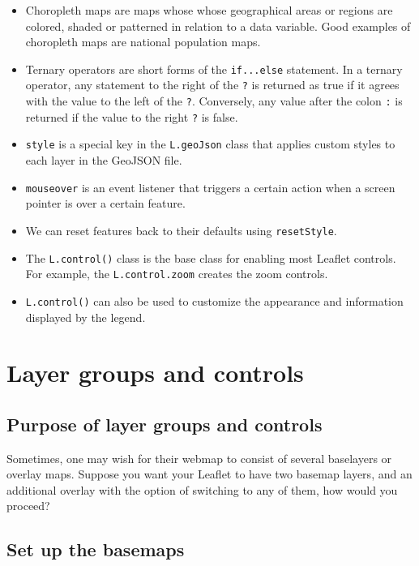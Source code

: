 \documentclass[
]{book}
\begin{document}
\begin{itemize}
\item
  Choropleth maps are maps whose whose geographical areas or regions are colored, shaded or patterned in relation to a data variable. Good examples of choropleth maps are national population maps.
\item
  Ternary operators are short forms of the \texttt{if...else} statement. In a ternary operator, any statement to the right of the \texttt{?} is returned as true if it agrees with the value to the left of the \texttt{?}. Conversely,
  any value after the colon \texttt{:} is returned if the value to the right \texttt{?} is false.
\item
  \texttt{style} is a special key in the \texttt{L.geoJson} class that applies custom styles to each layer in the GeoJSON file.
\item
  \texttt{mouseover} is an event listener that triggers a certain action when
  a screen pointer is over a certain feature.
\item
  We can reset features back to their defaults using \texttt{resetStyle}.
\item
  The \texttt{L.control()} class is the base class for enabling most Leaflet controls. For example, the \texttt{L.control.zoom} creates the zoom controls.
\item
  \texttt{L.control()} can also be used to customize the appearance and information displayed by the legend.
\end{itemize}

\hypertarget{layer-groups-and-controls}{%
\chapter{Layer groups and controls}\label{layer-groups-and-controls}}

\hypertarget{purpose-of-layer-groups-and-controls}{%
\section{Purpose of layer groups and controls}\label{purpose-of-layer-groups-and-controls}}

Sometimes, one may wish for their webmap to consist of several baselayers or overlay maps. Suppose you want your Leaflet to have two basemap layers, and an additional overlay with the option of switching to any of them, how would you proceed?

\hypertarget{set-up-the-basemaps}{%
\section{Set up the basemaps}\label{set-up-the-basemaps}}
\end{document}
